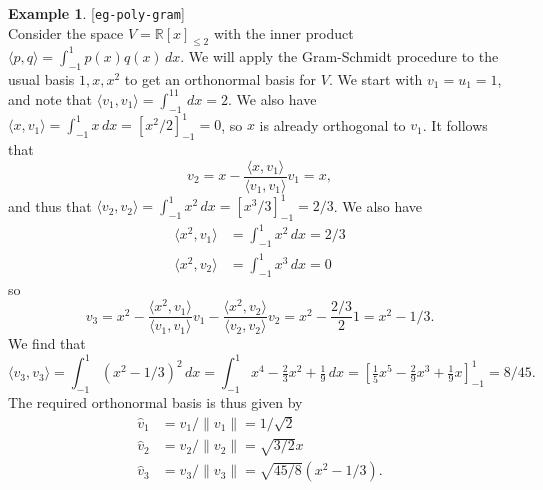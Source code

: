 \documentclass{amsart}
\newcommand{\lbl}[1]{\label{#1}\textup{[\texttt{#1}]}\ \\}
\newcommand{\lbl}{\label}
\newcommand{\R}         {{\mathbb{R}}}
\newcommand{\ip}[1]     {\langle #1\rangle}
\renewcommand{\:}       {\colon}
\theoremstyle{definition}
\newtheorem{example}[theorem]{Example}
\begin{document}
\begin{example}\lbl{eg-poly-gram}
 Consider the space $V=\R[x]_{\leq 2}$ with the inner
 product $\ip{p,q}=\int_{-1}^1 p(x)q(x)\,dx$.  We will apply
 the Gram-Schmidt procedure to the usual basis $1,x,x^2$ to
 get an orthonormal basis for $V$.  We start with
 $v_1=u_1=1$, and note that
 $\ip{v_1,v_1}=\int_{-1}^11\,dx=2$.  We also have
 $\ip{x,v_1}=\int_{-1}^1x\,dx=\left[x^2/2\right]_{-1}^1=0$, 
 so $x$ is already orthogonal to $v_1$.  It follows that 
 \[ v_2 = x - \frac{\ip{x,v_1}}{\ip{v_1,v_1}} v_1 = x, \]
 and thus that
 $\ip{v_2,v_2}=\int_{-1}^1x^2\,dx=\left[x^3/3\right]^1_{-1}=2/3$. 
 We also have 
 \begin{align*}
  \ip{x^2,v_1} &= \int_{-1}^1x^2\,dx=2/3 \\
  \ip{x^2,v_2} &= \int_{-1}^1x^3\,dx=0
 \end{align*}
 so 
 \[ v_3 = x^2 - \frac{\ip{x^2,v_1}}{\ip{v_1,v_1}} v_1 
              - \frac{\ip{x^2,v_2}}{\ip{v_2,v_2}} v_2 
        = x^2 - \frac{2/3}{2} 1 = x^2-1/3.
 \]
 We find that 
 \[ \ip{v_3,v_3} = \int_{-1}^1 (x^2-1/3)^2\,dx 
      = \int_{-1}^1 x^4 - \tfrac{2}{3}x^2 + \tfrac{1}{9} \,dx
      = \left[ \tfrac{1}{5}x^5 - \tfrac{2}{9}x^3 + \tfrac{1}{9}x\right]_{-1}^1
      = 8/45.
 \]
 The required orthonormal basis is thus given by
 \begin{align*}
  \hat{v}_1 &= v_1/\|v_1\| = 1/\sqrt{2} \\
  \hat{v}_2 &= v_2/\|v_2\| = \sqrt{3/2} x \\
  \hat{v}_3 &= v_3/\|v_3\| = \sqrt{45/8}(x^2-1/3).
 \end{align*}
\end{example}
\end{document}
